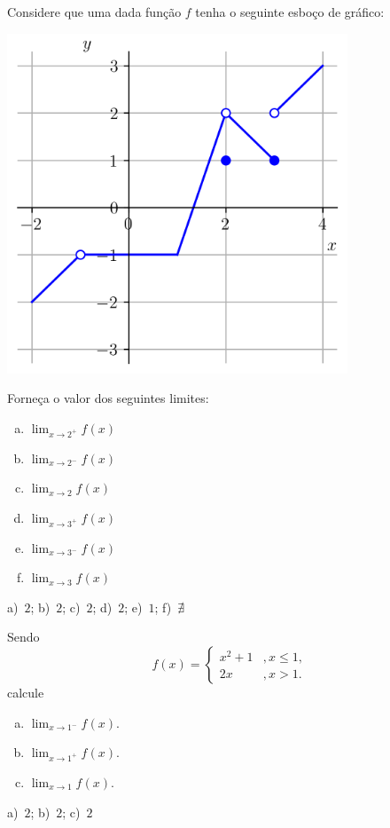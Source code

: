 \begin{exer}\label{exer:limgraf_lat}
  Considere que uma dada função $f$ tenha o seguinte esboço de gráfico:

  \includegraphics[width=4in]{./cap_lim/dados/fig_exer_limgraf/fig.png}

  Forneça o valor dos seguintes limites:
  \begin{enumerate}[a)]
  \item $\displaystyle \lim_{x\to 2^+} f(x)$
  \item $\displaystyle \lim_{x\to 2^-} f(x)$
  \item $\displaystyle \lim_{x\to 2} f(x)$
  \item $\displaystyle \lim_{x\to 3^+} f(x)$
  \item $\displaystyle \lim_{x\to 3^-} f(x)$
  \item $\displaystyle \lim_{x\to 3} f(x)$
  \end{enumerate}
\end{exer}
\begin{resp}
  a)~$2$; b)~$2$; c)~$2$; d)~$2$; e)~$1$; f)~$\nexists$
\end{resp}

\begin{exer}
  Sendo
  \begin{equation}
    f(x) = \left\{
      \begin{array}{ll}
        x^2+1 &, x\leq 1,\\
        2x &, x>1.
      \end{array}
    \right.
  \end{equation}
  calcule
  \begin{enumerate}[a)]
  \item $\displaystyle \lim_{x\to 1^-} f(x)$.
  \item $\displaystyle \lim_{x\to 1^+} f(x)$.
  \item $\displaystyle \lim_{x\to 1} f(x)$.
  \end{enumerate}
\end{exer}
\begin{resp}
  a)~$2$; b)~$2$; c)~$2$
\end{resp}

